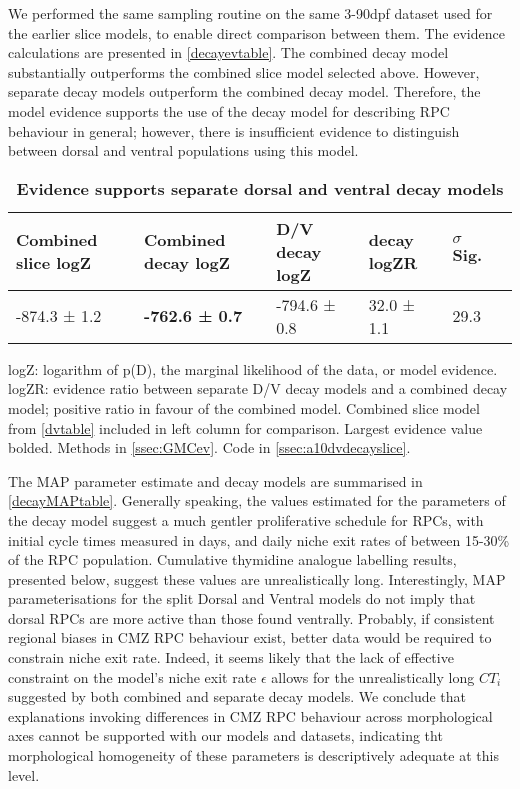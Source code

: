We performed the same sampling routine on the same 3-90dpf dataset used for the earlier slice models, to enable direct comparison between them. The evidence calculations are presented in \autoref{decayevtable}. The combined decay model substantially outperforms the combined slice model selected above. However, separate decay models outperform the combined decay model. Therefore, the model evidence supports the use of the decay model for describing RPC behaviour in general; however, there is insufficient evidence to distinguish between dorsal and ventral populations using this model.

\begin{table}[!ht]
    \centering
    \caption{{\bf Evidence supports separate dorsal and ventral decay models}}
    \begin{tabular}{|l|l|l|l|l|l|}
        \hline
        {\bf Combined slice logZ} & {\bf Combined decay logZ} & {\bf D/V decay logZ} & {\bf decay logZR} & {\bf $\sigma$ Sig.}\\ \hline
        -874.3 ± 1.2 & {\bf -762.6 ± 0.7} & -794.6 ± 0.8 & 32.0 ± 1.1 & 29.3\\ \hline
    \end{tabular}
    \begin{flushleft} logZ: logarithm of p(D), the marginal likelihood of the data, or model evidence. logZR: evidence ratio between separate D/V decay models and a combined decay model; positive ratio in favour of the combined model. Combined slice model from \autoref{dvtable} included in left column for comparison. Largest evidence value bolded.
    Methods in \autoref{ssec:GMCev}.
    Code in \autoref{ssec:a10dvdecayslice}.     
    \end{flushleft}
    \label{decayevtable}
\end{table}

The MAP parameter estimate and decay models are summarised in \autoref{decayMAPtable}. Generally speaking, the values estimated for the parameters of the decay model suggest a much gentler proliferative schedule for RPCs, with initial cycle times measured in days, and daily niche exit rates of between 15-30\% of the RPC population. Cumulative thymidine analogue labelling results, presented below, suggest these values are unrealistically long. Interestingly, MAP parameterisations for the split Dorsal and Ventral models do not imply that dorsal RPCs are more active than those found ventrally. Probably, if consistent regional biases in CMZ RPC behaviour exist, better data would be required to constrain niche exit rate. Indeed, it seems likely that the lack of effective constraint on the model's niche exit rate $\epsilon$ allows for the unrealistically long $CT_{i}$ suggested by both combined and separate decay models. We conclude that explanations invoking differences in CMZ RPC behaviour across morphological axes  cannot be supported with our models and datasets, indicating tht morphological homogeneity of these parameters is descriptively adequate at this level.

